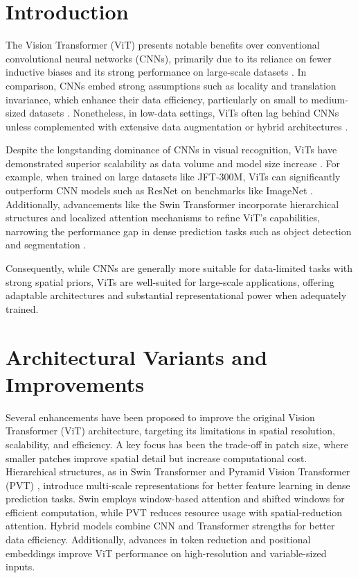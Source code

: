 \documentclass[conference]{IEEEtran}
\begin{document}
\section{Introduction}
The Vision Transformer (ViT) presents notable benefits over conventional convolutional neural networks (CNNs), primarily due to its reliance on fewer inductive biases and its strong performance on large-scale datasets \cite{dosovitskiy2021an}. In comparison, CNNs embed strong assumptions such as locality and translation invariance, which enhance their data efficiency, particularly on small to medium-sized datasets \cite{wu2021cvt}. Nonetheless, in low-data settings, ViTs often lag behind CNNs unless complemented with extensive data augmentation or hybrid architectures \cite{touvron2021training, wu2021cvt}.

Despite the longstanding dominance of CNNs in visual recognition, ViTs have demonstrated superior scalability as data volume and model size increase \cite{dosovitskiy2021an, touvron2021training}. For example, when trained on large datasets like JFT-300M, ViTs can significantly outperform CNN models such as ResNet on benchmarks like ImageNet \cite{dosovitskiy2021an}. Additionally, advancements like the Swin Transformer incorporate hierarchical structures and localized attention mechanisms to refine ViT's capabilities, narrowing the performance gap in dense prediction tasks such as object detection and segmentation \cite{liu2021swin, wang2021pyramidvisiontransformerversatile}.

Consequently, while CNNs are generally more suitable for data-limited tasks with strong spatial priors, ViTs are well-suited for large-scale applications, offering adaptable architectures and substantial representational power when adequately trained.


\section{Architectural Variants and Improvements}

Several enhancements have been proposed to improve the original Vision Transformer (ViT) architecture, targeting its limitations in spatial resolution, scalability, and efficiency. A key focus has been the trade-off in patch size, where smaller patches improve spatial detail but increase computational cost. Hierarchical structures, as in Swin Transformer \cite{liu2021swin} and Pyramid Vision Transformer (PVT) \cite{wang2021pyramidvisiontransformerversatile}, introduce multi-scale representations for better feature learning in dense prediction tasks. Swin employs window-based attention and shifted windows for efficient computation, while PVT reduces resource usage with spatial-reduction attention. Hybrid models \cite{dosovitskiy2021an, wu2021cvt} combine CNN and Transformer strengths for better data efficiency. Additionally, advances in token reduction and positional embeddings improve ViT performance on high-resolution and variable-sized inputs.
\end{document}
